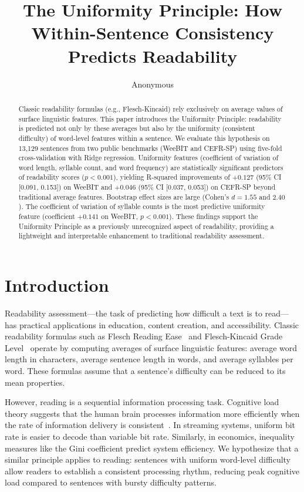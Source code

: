 \documentclass[11pt,letterpaper]{article}
\title{The Uniformity Principle: How Within-Sentence Consistency Predicts Readability}
\author{Anonymous}
\date{}
\begin{document}
\sloppy

\maketitle

\begin{abstract}
Classic readability formulas (e.g., Flesch-Kincaid) rely exclusively on average values of surface linguistic features. This paper introduces the Uniformity Principle: readability is predicted not only by these averages but also by the uniformity (consistent difficulty) of word-level features within a sentence. We evaluate this hypothesis on 13,129 sentences from two public benchmarks (WeeBIT and CEFR-SP) using five-fold cross-validation with Ridge regression. Uniformity features (coefficient of variation of word length, syllable count, and word frequency) are statistically significant predictors of readability scores ($p < 0.001$), yielding R-squared improvements of $+0.127$ (95\% CI [0.091, 0.153]) on WeeBIT and $+0.046$ (95\% CI [0.037, 0.053]) on CEFR-SP beyond traditional average features. Bootstrap effect sizes are large (Cohen's $d = 1.55$ and $2.40$). The coefficient of variation of syllable counts is the most predictive uniformity feature (coefficient $+0.141$ on WeeBIT, $p < 0.001$). These findings support the Uniformity Principle as a previously unrecognized aspect of readability, providing a lightweight and interpretable enhancement to traditional readability assessment.
\end{abstract}

\section{Introduction}

Readability assessment---the task of predicting how difficult a text is to read---has practical applications in education, content creation, and accessibility. Classic readability formulas such as Flesch Reading Ease~\cite{Flesch1948} and Flesch-Kincaid Grade Level~\cite{Kincaid1975} operate by computing averages of surface linguistic features: average word length in characters, average sentence length in words, and average syllables per word. These formulas assume that a sentence's difficulty can be reduced to its mean properties.

However, reading is a sequential information processing task. Cognitive load theory suggests that the human brain processes information more efficiently when the rate of information delivery is consistent~\cite{Sweller1988}. In streaming systems, uniform bit rate is easier to decode than variable bit rate. Similarly, in economics, inequality measures like the Gini coefficient predict system efficiency. We hypothesize that a similar principle applies to reading: sentences with uniform word-level difficulty allow readers to establish a consistent processing rhythm, reducing peak cognitive load compared to sentences with bursty difficulty patterns.
\end{document}
